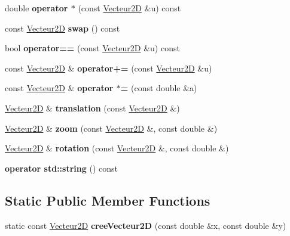\begin{DoxyCompactItemize}
\mbox{\label{class_vecteur2_d_ab1ba03f6de3981612dc3e757c02e196e}} 
double {\bfseries operator $\ast$} (const \mbox{\hyperlink{class_vecteur2_d}{Vecteur2D}} \&u) const
\item 
\mbox{\label{class_vecteur2_d_a5b9655efe1f812fe9f4f213390b228d3}} 
const \mbox{\hyperlink{class_vecteur2_d}{Vecteur2D}} {\bfseries swap} () const
\item 
\mbox{\label{class_vecteur2_d_a31c934338acaa4aa727f6793063060a5}} 
bool {\bfseries operator==} (const \mbox{\hyperlink{class_vecteur2_d}{Vecteur2D}} \&u) const
\item 
\mbox{\label{class_vecteur2_d_a1d9bad0a209c91562afbbda7f6ece549}} 
const \mbox{\hyperlink{class_vecteur2_d}{Vecteur2D}} \& {\bfseries operator+=} (const \mbox{\hyperlink{class_vecteur2_d}{Vecteur2D}} \&u)
\item 
\mbox{\label{class_vecteur2_d_ab5a1f44bbe053d0be651e2606cc574a7}} 
const \mbox{\hyperlink{class_vecteur2_d}{Vecteur2D}} \& {\bfseries operator $\ast$=} (const double \&a)
\item 
\mbox{\label{class_vecteur2_d_a3da91a86c0c3181dde3ddf94bc140cdc}} 
\mbox{\hyperlink{class_vecteur2_d}{Vecteur2D}} \& {\bfseries translation} (const \mbox{\hyperlink{class_vecteur2_d}{Vecteur2D}} \&)
\item 
\mbox{\label{class_vecteur2_d_a359dfc5ed34bfdd9521a776ae526eda4}} 
\mbox{\hyperlink{class_vecteur2_d}{Vecteur2D}} \& {\bfseries zoom} (const \mbox{\hyperlink{class_vecteur2_d}{Vecteur2D}} \&, const double \&)
\item 
\mbox{\label{class_vecteur2_d_ab735c98bbd7fc2e1f78d58ca99009e9d}} 
\mbox{\hyperlink{class_vecteur2_d}{Vecteur2D}} \& {\bfseries rotation} (const \mbox{\hyperlink{class_vecteur2_d}{Vecteur2D}} \&, const double \&)
\item 
\mbox{\label{class_vecteur2_d_a8b22687c2b48683ee8ed0d8121c25dac}} 
{\bfseries operator std\+::string} () const
\end{DoxyCompactItemize}
\subsection*{Static Public Member Functions}
\begin{DoxyCompactItemize}
\item 
\mbox{\label{class_vecteur2_d_a85007e9bf7d9f738124042609ca48dd5}} 
static const \mbox{\hyperlink{class_vecteur2_d}{Vecteur2D}} {\bfseries cree\+Vecteur2D} (const double \&x, const double \&y)
\end{DoxyCompactItemize}
